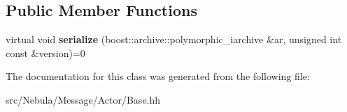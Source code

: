 \subsection*{\-Public \-Member \-Functions}
\begin{DoxyCompactItemize}
\item 
\hypertarget{classNeb_1_1Message_1_1Actor_1_1IBase_a86d97e6e5bc6579d4a408911c8e516c7}{virtual void {\bfseries serialize} (boost\-::archive\-::polymorphic\-\_\-iarchive \&ar, unsigned int const \&version)=0}\label{classNeb_1_1Message_1_1Actor_1_1IBase_a86d97e6e5bc6579d4a408911c8e516c7}

\end{DoxyCompactItemize}


\-The documentation for this class was generated from the following file\-:\begin{DoxyCompactItemize}
\item 
src/\-Nebula/\-Message/\-Actor/\-Base.\-hh\end{DoxyCompactItemize}
